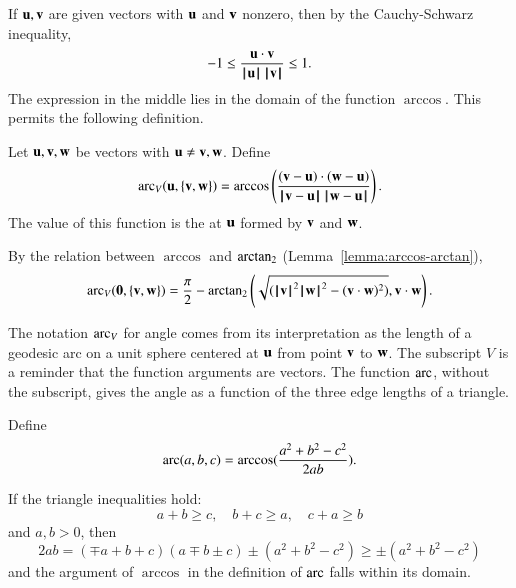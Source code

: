 If $\u,\v$ are given vectors with $\u$ and $\v$ nonzero, then by the
Cauchy-Schwarz inequality,
    $$-1 \le \frac{\u\cdot \v}{\normo{\u}\,\normo{\v}} \le 1.$$
The expression in the middle lies in the domain of the function $\arccos$. This permits the following definition.
%
%
%

\begin{definition}\label{def:angle}
Let $\u,\v,\w$ be vectors with $\u\ne \v,\w$.
Define 
    $$
    \arc_V(\u,\{\v,\w\}) = \arccos\left(\frac{(\v-\u)\cdot (\w-\u)}{\norm{\v}{\u}\,\norm{\w}{\u}}\right).
    $$
The value of this function is the  at $\u$ formed by $\v$ and $\w$.
%
%
%
%
%
\end{definition}

By the relation between $\arccos$ and $\atn$
(Lemma~\ref{lemma:arccos-arctan}), %
    \begin{equation}\label{eqn:angle}
    \arc_V(\orz,\{\v,\w\}) = \frac{\pi}2 - \atn\left ({\sqrt{(\normo{\v}^2\normo{\w}^2 -
    (\v\cdot \w)^2)}}, {\v\cdot \w}\right).
    \end{equation}
%

The notation $\arc_V$ for angle comes from its interpretation as the
length of a geodesic arc on a unit sphere
centered at $\u$ from point $\v$ to $\w$.
%
The subscript $V$ is a reminder that
the function arguments are vectors.  The function
$\arc$, without the subscript,  gives the angle as a function
of the three edge lengths of a triangle.
%
%
%


\begin{definition}[arc]\label{def:arc}
Define
 $$\arc(a,b,c) = \arccos(\frac{a^2 + b^2 - c^2}{2 a b}).$$
%
\end{definition}

If the triangle inequalities hold:
$$
a + b \ge c,\quad b + c \ge a, \quad c+a \ge b
$$
and $a,b >0$, then
$$
2 a b = (\mp a+b+c)(a \mp b \pm c) \pm (a^2 + b^2 - c^2) \ge \pm  (a^2 + b^2 - c^2)
$$
and the argument of $\arccos$ in the definition of $\arc$  falls within its domain.

